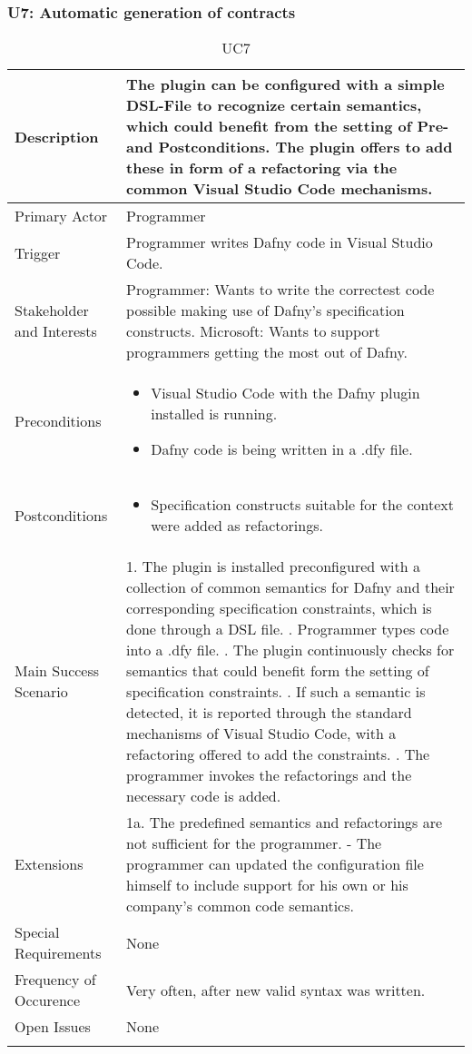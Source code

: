 \subsubsection{U7: Automatic generation of contracts}
\begin{longtable}{l | p{} }
	Description & The plugin can be configured with a simple DSL-File to recognize certain semantics, which could benefit from the setting of Pre- and Postconditions. The plugin offers to add these in form of a refactoring via the common Visual Studio Code mechanisms.\\ \hline
	Primary Actor & Programmer\\ \hline
	Trigger & Programmer writes Dafny code in Visual Studio Code.\\ \hline
	Stakeholder and Interests & Programmer: Wants to write the correctest code possible making use of Dafny's specification constructs. \newline Microsoft: Wants to support programmers getting the most out of Dafny.\\ \hline
	Preconditions &
	\begin{itemize}
		\item Visual Studio Code with the Dafny plugin installed is running.
		\item Dafny code is being written in a .dfy file.
	\end{itemize}\\ \hline
	Postconditions &
	\begin{itemize}
		\item Specification constructs suitable for the context were added as refactorings.
	\end{itemize}\\ \hline
	Main Success Scenario & 
	1. The plugin is installed preconfigured with a collection of common semantics for Dafny and their corresponding specification constraints, which is done through a DSL file. \newline
	2. Programmer types code into a .dfy file. \newline 
	3. The plugin continuously checks for semantics that could benefit form the setting of specification constraints. \newline 
	4. If such a semantic is detected, it is reported through the standard mechanisms of Visual Studio Code, with a refactoring offered to add the constraints. \newline
	5. The programmer invokes the refactorings and the necessary code is added.\\ \hline
	Extensions & 
	1a. The predefined semantics and refactorings are not sufficient for the programmer. \newline 
	- The programmer can updated the configuration file himself to include support for his own or his company's  common code semantics. \\ \hline
	Special Requirements & None\\ \hline
	Frequency of Occurence & Very often, after new valid syntax was written.\\ \hline
	Open Issues & None \\ \hline
	\caption{UC7}
\end{longtable}

